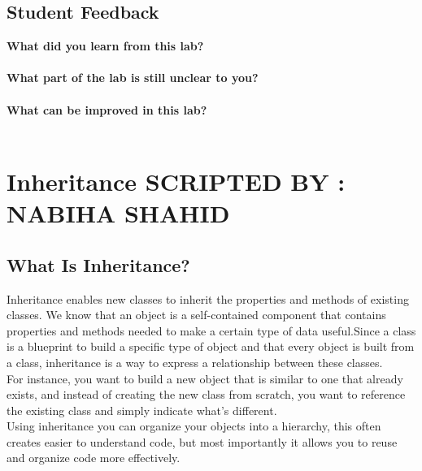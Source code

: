 \documentclass[11pt,fleqn]{book} %
\begin{document}
\newpage
\section{Student Feedback}
\textbf{What did you learn from this lab?}\\
\noindent\fbox{\parbox{\textwidth}{
  }
}\\
\textbf{What part of the lab is still unclear to you?}\\
\noindent\fbox{\parbox{\textwidth}{
  }
}\\
\textbf{What can be improved in this lab?}\\ 
\noindent\fbox{\parbox{\textwidth}{
  }
}\\

\newpage


\chapter{Inheritance \hspace{65mm} {\textsc{\small SCRIPTED BY : NABIHA SHAHID}}}

\section{What Is Inheritance?}

Inheritance enables new classes to inherit the properties and methods of existing classes. We know that an object is a self-contained component that contains properties and methods needed to make a certain type of data useful.Since a class is a blueprint to build a specific type of object and that every object is built from a class, inheritance is a way to express a relationship between these classes.\\
For instance, you want to build a new object that is similar to one that already exists, and instead of creating the new class from scratch, you want to reference the existing class and simply indicate what's different.\\
Using inheritance you can organize your objects into a hierarchy, this often creates easier to understand code, but most importantly it allows you to reuse and organize code more effectively.
\end{document}
